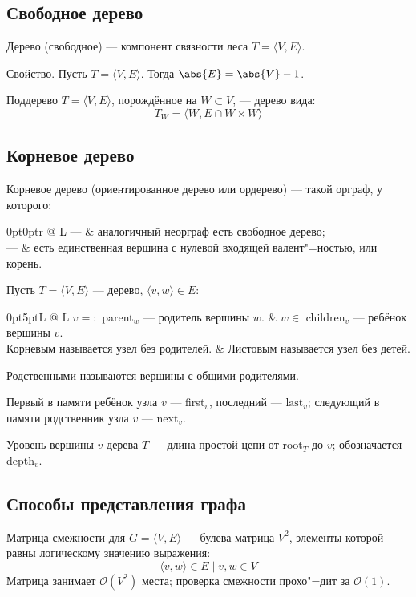 \subsection{Свободное дерево}

{\bold Дерево} {\ital (свободное)} --- компонент связности леса $T=\langle V,E\rangle$.

{\ital Свойство.} Пусть $T=\langle V,E\rangle$. Тогда $\abs{E}=\abs{V}-1$.

{\ital Поддерево $T=\langle V,E\rangle$, порождённое} на $W\subset V$, --- дерево вида:
$$T_W=\langle W,E\cap W\times W\rangle$$

\subsection{Корневое дерево}

{\bold Корневое дерево} {\ital (ориентированное дерево или ордерево)} --- такой орграф, у которого:

\begin{tabularcx}{0pt}{0pt}{r @{ } L}{\textwidth}
--- & аналогичный неорграф есть свободное дерево;\\
--- & есть единственная вершина с нулевой входящей валент"=ностью, или {\ital корень}.
\end{tabularcx}

Пусть $T=\langle V,E\rangle$ --- дерево, $\langle v,w\rangle\in E$:
\begin{tabularcx}{0pt}{5pt}{L @{\quad} L}{\textwidth}
$v=:$ parent$_w$ --- {\ital родитель} вершины $w$. & $w\in$ children$_v$ --- {\ital ребёнок} вершины $v$.\\
{\ital Корневым} называется узел без родителей. & {\ital Листовым} называется узел без детей.
\end{tabularcx}

{\ital Родственными} называются вершины с общими родителями.

{\ital Первый} в памяти ребёнок узла $v$ --- first$_v$, {\ital последний} --- $\text{last}_v$; {\ital следующий} в памяти родственник узла $v$ --- next$_v$.

{\ital Уровень} вершины $v$ дерева $T$ --- длина простой цепи от root$_T$ до $v$; обозначается depth$_v$.

\subsection{Способы представления графа}

{\ital Матрица смежности} для $G=\langle V,E\rangle$ --- булева матрица $V^2$, элементы которой равны логическому значению выражения:
$$\langle v,w\rangle\in E\mid v,w\in V$$
Матрица занимает $\mathcal{O}(V^2)$ места; проверка смежности прохо"=дит за $\mathcal{O}(1)$.

